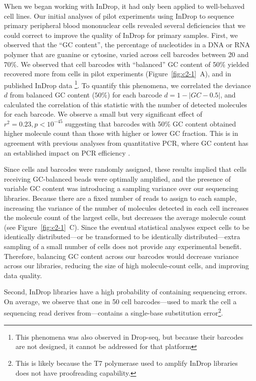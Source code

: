 When we began working with InDrop, it had only been applied to well-behaved cell lines. 
Our initial analyses of pilot experiments using InDrop to sequence primary peripheral blood mononuclear cells revealed several deficiencies that we could correct to improve the quality of InDrop for primary samples.
First, we observed that the ``GC content'', the percentage of nucleotides in a DNA or RNA polymer that are guanine or cytosine, varied across cell barcodes between 20 and 70\%. 
We observed that cell barcodes with ``balanced'' GC content of 50\% yielded recovered more from cells in pilot experiments (Figure~\ref{fig:c2-1}~A), and in published InDrop data \citep{Klein2015}\footnote{This phenomena was also observed in Drop-seq, but because their barcodes are not designed, it cannot be addressed for that platform}.
To quantify this phenomena, we correlated the deviance $d$ from balanced GC content ($50\%$) for each barcode $d = 1 - |GC - 0.5|$, and calculated the correlation of this statistic with the number of detected molecules for each barcode. 
We observe a small but very significant effect of $r^{2} = 0.23, p < 10^{-45}$ suggesting that barcodes with 50\% GC content obtained higher molecule count than those with higher or lower GC fraction.
This is in agreement with previous analyses from quantitative PCR, where GC content has an established impact on PCR efficiency \citep{Mamedov2008}. 

Since cells and barcodes were randomly assigned, these results implied that cells receiving GC-balanced beads were optimally amplified, and the presence of variable GC content was introducing a sampling variance over our sequencing libraries.
Because there are a fixed number of reads to assign to each sample, increasing the variance of the number of molecules detected in each cell increases the molecule count of the largest cells, but decreases the average molecule count (see Figure~\ref{fig:c2-1}~C).
Since the eventual statistical analyses expect cells to be identically distributed---or be transformed to be identically distributed---extra sampling of a small number of cells does not provide any experimental benefit. 
Therefore, balancing GC content across our barcodes would decrease variance across our libraries, reducing the size of high molecule-count cells, and improving data quality. 

Second, InDrop libraries have a high probability of containing sequencing errors. 
On average, we observe that one in 50 cell barcodes---used to mark the cell a sequencing read derives from---contains a single-base substitution error\footnote{This is likely because the T7 polymerase used to amplify InDrop libraries does not have proofreading capability.}. 

